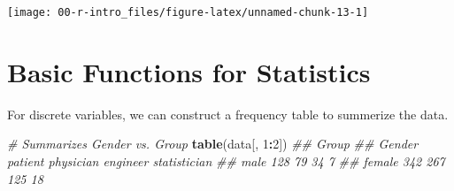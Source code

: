 \documentclass[
]{article}
\newenvironment{Shaded}{\begin{snugshade}}{\end{snugshade}}
\newcommand{\CommentTok}[1]{\textcolor[rgb]{0.56,0.35,0.01}{\textit{#1}}}
\newcommand{\DataTypeTok}[1]{\textcolor[rgb]{0.13,0.29,0.53}{#1}}
\newcommand{\DecValTok}[1]{\textcolor[rgb]{0.00,0.00,0.81}{#1}}
\newcommand{\FloatTok}[1]{\textcolor[rgb]{0.00,0.00,0.81}{#1}}
\newcommand{\KeywordTok}[1]{\textcolor[rgb]{0.13,0.29,0.53}{\textbf{#1}}}
\newcommand{\NormalTok}[1]{#1}
\newcommand{\OperatorTok}[1]{\textcolor[rgb]{0.81,0.36,0.00}{\textbf{#1}}}
\newcommand{\OtherTok}[1]{\textcolor[rgb]{0.56,0.35,0.01}{#1}}
\newcommand{\StringTok}[1]{\textcolor[rgb]{0.31,0.60,0.02}{#1}}
\begin{document}
\begin{Shaded}
\end{Shaded}

\begin{center}\texttt{[image: 00-r-intro\_files/figure-latex/unnamed-chunk-13-1]} \end{center}

\hypertarget{basic-functions-for-statistics}{%
\section{Basic Functions for
Statistics}\label{basic-functions-for-statistics}}

For discrete variables, we can construct a frequency table to summerize
the data.

\begin{Shaded}
\begin{Highlighting}[]
    \CommentTok{# Summarizes Gender vs. Group}
    \KeywordTok{table}\NormalTok{(data[, }\DecValTok{1}\OperatorTok{:}\DecValTok{2}\NormalTok{])}
\CommentTok{##         Group}
\CommentTok{## Gender   patient physician engineer statistician}
\CommentTok{##   male       128        79       34            7}
\CommentTok{##   female     342       267      125           18}
\end{Highlighting}
\end{Shaded}
\end{document}
